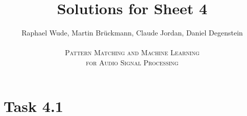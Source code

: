 \documentclass[12pt]{article}
\begin{document}
\title{Solutions for Sheet 4}
\author{Raphael Wude, Martin Brückmann, Claude Jordan, Daniel Degenstein\\ \\
\textsc{Pattern Matching and Machine Learning} \\
\textsc{for Audio Signal Processing}}
\maketitle

\section*{Task 4.1}
\end{document}

